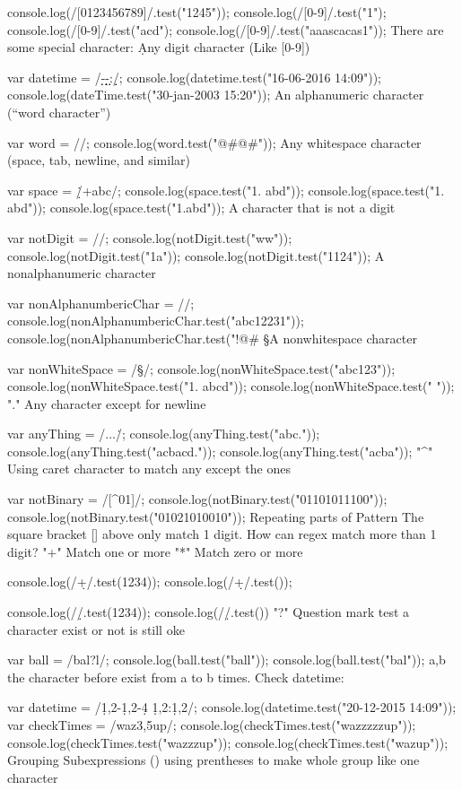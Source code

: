 console.log(/[0123456789]/.test("1245"));
console.log(/[0-9]/.test("1");
console.log(/[0-9]/.test("acd");
console.log(/[0-9]/.test("aaascacas1"));
There are some special character:
\d Any digit character (Like [0-9])

var datetime = /\d\d-\d\d-\d\d\d\d\s\d\d:\d\d/;
console.log(datetime.test("16-06-2016 14:09"));
console.log(dateTime.test("30-jan-2003 15:20"));
\w An alphanumeric character (“word character”)

var word = /\w/;
console.log(word.test("@#@#"));
\s Any whitespace character (space, tab, newline, and similar)

var space = /\d\.\s+abc/;
console.log(space.test("1. abd"));
console.log(space.test("1.     abd"));
console.log(space.test("1.abd"));
\D A character that is not a digit

var notDigit = /\D/;
console.log(notDigit.test("ww"));
console.log(notDigit.test("1a"));
console.log(notDigit.test("1124"));
\W A nonalphanumeric character

var nonAlphanumbericChar = /\W/;
console.log(nonAlphanumbericChar.test("abc12231"));
console.log(nonAlphanumbericChar.test("!@#%
\S A nonwhitespace character

var nonWhiteSpace = /\S/;
console.log(nonWhiteSpace.test("abc123"));
console.log(nonWhiteSpace.test("1.  abcd"));
console.log(nonWhiteSpace.test("  "));
"." Any character except for newline

var anyThing = /...\./;
console.log(anyThing.test("abc."));
console.log(anyThing.test("acbacd."));
console.log(anyThing.test("acba"));
"^" Using caret character to match any except the ones

var notBinary = /[^01]/;
console.log(notBinary.test("01101011100"));
console.log(notBinary.test("01021010010"));
Repeating parts of Pattern
The square bracket [] above only match 1 digit. How can regex match more than 1 digit?
"+" Match one or more
"*" Match zero or more

console.log(/\d+/.test(1234));
console.log(/\d+/.test());

console.log(/\d*/.test(1234));
console.log(/\d*/.test())
"?" Question mark test a character exist or not is still oke

var ball = /bal?l/;
console.log(ball.test("ball"));
console.log(ball.test("bal"));
{a,b} the character before exist from a to b times. Check datetime:

var datetime = /\d{1,2}-\d{1,2}-\d{4} \d{1,2}:\d{1,2}/;
console.log(datetime.test("20-12-2015 14:09"));
var checkTimes = /waz{3,5}up/;
console.log(checkTimes.test("wazzzzzup"));
console.log(checkTimes.test("wazzzup"));
console.log(checkTimes.test("wazup"));
Grouping Subexpressions
() using prentheses to make whole group like one character

